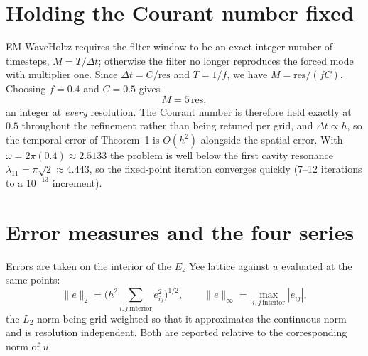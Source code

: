 \documentclass[11pt]{article}
\begin{document}
\section{Holding the Courant number fixed}

EM-WaveHoltz requires the filter window to be an exact integer number of
timesteps, $M = T/\Delta t$; otherwise the filter no longer reproduces the
forced mode with multiplier one. Since $\Delta t = C/\text{res}$ and
$T = 1/f$, we have $M = \text{res}/(fC)$. Choosing $f = 0.4$ and $C = 0.5$ gives
\begin{equation}
  M = 5\,\text{res},
\end{equation}
an integer at \emph{every} resolution. The Courant number is therefore held
exactly at $0.5$ throughout the refinement rather than being retuned per grid,
and $\Delta t \propto h$, so the temporal error of Theorem~1 is $O(h^2)$
alongside the spatial error. With $\omega = 2\pi(0.4) \approx 2.5133$ the
problem is well below the first cavity resonance $\lambda_{11} = \pi\sqrt2
\approx 4.443$, so the fixed-point iteration converges quickly (7--12
iterations to a $10^{-13}$ increment).

\section{Error measures and the four series}

Errors are taken on the interior of the $E_z$ Yee lattice against $u$ evaluated
at the same points:
\begin{equation}
  \|e\|_{2} = \Big(h^2\!\!\sum_{i,j\ \text{interior}}\!\! e_{ij}^2\Big)^{1/2},
  \qquad
  \|e\|_{\infty} = \max_{i,j\ \text{interior}} |e_{ij}| ,
\end{equation}
the $L_2$ norm being grid-weighted so that it approximates the continuous norm
and is resolution independent. Both are reported relative to the corresponding
norm of $u$.
\end{document}
